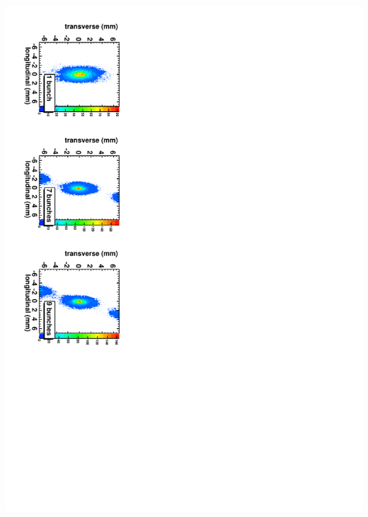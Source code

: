 \documentclass[xcolor=pdftex,table,10pt,yellow,mathserif]{beamer}
\begin{document}
{  \includegraphics[angle=90,width=0.95\linewidth]{figures/C9B7BSB-2D-1mA-130.pdf}
}
\end{document}
